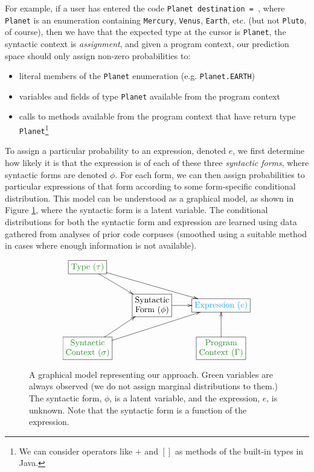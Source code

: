 For example, if a user has entered the code \texttt{Planet destination = }, where \verb|Planet| is an enumeration containing \verb|Mercury|, \verb|Venus|, \verb|Earth|, etc. (but not \verb|Pluto|, of course), then we have that the expected type at the cursor is \verb|Planet|, the syntactic context is \emph{assignment}, and given a program context, our prediction space should only assign non-zero probabilities to:
\begin{itemize}
\item literal members of the \verb|Planet| enumeration (e.g. \verb|Planet.EARTH|)
\item variables and fields of type \verb|Planet| available from the program context
\item calls to methods available from the program context that have return type \texttt{Planet}\footnote{We can consider  operators like $+$ and $[]$ as methods of the built-in types in Java.}
\end{itemize}
To assign a particular probability to an expression, denoted $e$, we first determine how likely it is that the expression is of each of these three \emph{syntactic forms}, where syntactic forms are denoted $\phi$. For each form, we can then assign probabilities to particular expressions of that form according to some form-specific conditional distribution. This model can be understood as a graphical model, as shown in Figure \ref{graphicalmodel}, where the syntactic form is a latent variable. The conditional distributions for both the syntactic form and expression are learned using data gathered from analyses of prior code corpuses (smoothed using a suitable method in cases where enough information is not available).
\begin{figure}
    \begin{displaymath}
    \xymatrix{
      *+[F]{\color{ForestGreen}\txt{Type ($\tau$)}} \ar[dr] \ar[drr] & & \\
      & *+[F]{\color{black} \txt{Syntactic\\Form ($\phi$)}} \ar[r] & *+[F]{\color{cyan}\txt{Expression ($e$)}}  \\
      *+[F]{\color{ForestGreen}\txt{Syntactic\\Context ($\sigma$)}} \ar[ur] \ar[urr] & & *+[F]{\color{ForestGreen}\txt{Program\\Context ($\Gamma$)}} \ar[u]  
    }
    \end{displaymath}
\caption{\small A graphical model representing our approach. Green variables are always observed (we do not assign marginal distributions to them.) The syntactic form, $\phi$, is a latent variable, and the expression, $e$, is unknown. Note that the syntactic form is a function of the expression. \label{graphicalmodel}}
\end{figure}

